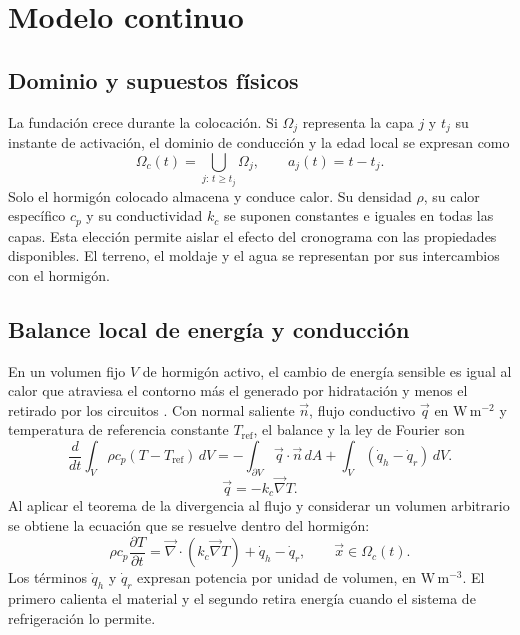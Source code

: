 \section{Modelo continuo}
\label{sec:modelo-continuo}

\subsection{Dominio y supuestos físicos}
La fundación crece durante la colocación. Si $\Omega_j$ representa la capa $j$ y $t_j$ su instante de activación, el dominio de conducción y la edad local se expresan como
\begin{equation}
  \Omega_c(t)=\bigcup_{j:\,t\geq t_j}\Omega_j,
  \qquad a_j(t)=t-t_j.
  \label{eq:dominio-edad}
\end{equation}
Solo el hormigón colocado almacena y conduce calor. Su densidad $\rho$, su calor específico $c_p$ y su conductividad $k_c$ se suponen constantes e iguales en todas las capas. Esta elección permite aislar el efecto del cronograma con las propiedades disponibles. El terreno, el moldaje y el agua se representan por sus intercambios con el hormigón.

\subsection{Balance local de energía y conducción}
En un volumen fijo $V$ de hormigón activo, el cambio de energía sensible es igual al calor que atraviesa el contorno más el generado por hidratación y menos el retirado por los circuitos \citep{inlTransferencia}. Con normal saliente $\vec n$, flujo conductivo $\vec q$ en $\mathrm{W\,m^{-2}}$ y temperatura de referencia constante $T_{\mathrm{ref}}$, el balance y la ley de Fourier son
\begin{equation}
  \frac{d}{dt}\int_V \rho c_p(T-T_{\mathrm{ref}})\,dV
  =-\int_{\partial V}\vec{q}\cdot\vec{n}\,dA
   +\int_V(\dot q_h-\dot q_r)\,dV.
  \label{eq:balance-integral}
\end{equation}
\begin{equation}
  \vec{q}=-k_c\vec{\nabla} T.
  \label{eq:fourier}
\end{equation}
Al aplicar el teorema de la divergencia al flujo y considerar un volumen arbitrario se obtiene la ecuación que se resuelve dentro del hormigón:
\begin{equation}
  \rho c_p\frac{\partial T}{\partial t}
  =\vec{\nabla}\cdot(k_c\vec{\nabla} T)+\dot q_h-\dot q_r,
  \qquad \vec{x}\in\Omega_c(t).
  \label{eq:calor-modelo}
\end{equation}
Los términos $\dot q_h$ y $\dot q_r$ expresan potencia por unidad de volumen, en $\mathrm{W\,m^{-3}}$. El primero calienta el material y el segundo retira energía cuando el sistema de refrigeración lo permite.

